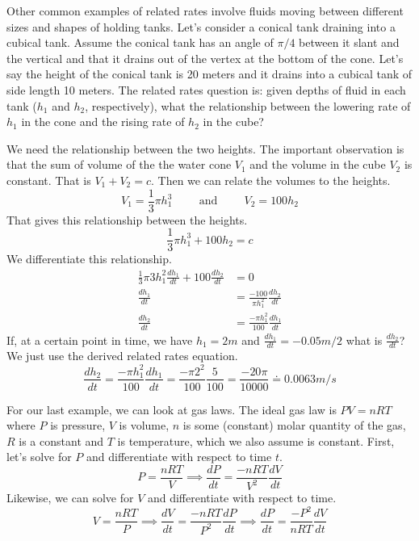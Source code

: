\documentclass[fleqn]{report}
\begin{document}
\begin{example}
Other common examples of related rates involve fluids moving
between different sizes and shapes of holding tanks. Let's
consider a conical tank draining into a cubical tank. Assume
the conical tank has an angle of $\pi/4$ between it slant and
the vertical and that it drains out of the vertex at the
bottom of the cone. Let's say the height of the conical
tank is 20 meters and it drains into a cubical tank of side
length 10 meters. The related rates question is: given
depths of fluid in each tank ($h_1$ and $h_2$, respectively),
what the relationship between the lowering rate of $h_1$ in
the cone and the rising rate of $h_2$ in the cube?

We need the relationship between the two heights. The
important observation is that the sum of volume of the the
water cone $V_1$ and the volume in the cube $V_2$ is constant.
That is $V_1 + V_2 = c$. Then we can relate the volumes to
the heights.
\begin{equation*}
V_1 = \frac{1}{3} \pi h_1^3 \hspace{1cm} \text{and}
\hspace{1cm} V_2 = 100 h_2
\end{equation*}
That gives this relationship between the heights.
\begin{equation*}
\frac{1}{3} \pi h_1^3 + 100 h_2 = c 
\end{equation*}
We differentiate this relationship.
\begin{align*}
\frac{1}{3} \pi 3h_1^2 \frac{dh_1}{dt} + 100 \frac{dh_2}{dt} & = 0 \\
\frac{dh_1}{dt} & = \frac{-100}{\pi h_1^2} \frac{dh_2}{dt} \\
\frac{dh_2}{dt} & = \frac{-\pi h_1^2}{100} \frac{dh_1}{dt} 
\end{align*}
If, at a certain point in time, we have $h_1 = 2m$ and
$\frac{dh_1}{dt} = -0.05m/2$ what is $\frac{dh_2}{dt}$? We
just use the derived related rates equation.
\begin{equation*}
\frac{dh_2}{dt} = \frac{-\pi h_1^2}{100} \frac{dh_1}{dt} =
\frac{-\pi 2^2}{100} \frac{5}{100} = \frac{-20\pi}{10000} \doteq
0.0063 m/s
\end{equation*}
\end{example}

\begin{example}
For our last example, we can look at gas laws. The ideal gas
law is $PV = nRT$ where $P$ is pressure, $V$ is volume, $n$ is
some (constant) molar quantity of the gas, $R$ is a constant
and $T$ is temperature, which we also assume is constant.
First, let's solve for $P$ and differentiate with respect to
time $t$.
\begin{equation*}
P = \frac{nRT}{V} \implies \frac{dP}{dt} = \frac{-nRT}{V^2}
\frac{dV}{dt} 
\end{equation*}
Likewise, we can solve for $V$ and differentiate with respect
to time.
\begin{equation*}
V = \frac{nRT}{P} \implies \frac{dV}{dt} = \frac{-nRT}{P^2}
\frac{dP}{dt} \implies \frac{dP}{dt} = \frac{-P^2}{nRT}
\frac{dV}{dt}
\end{equation*}
\end{example}
\end{document}
